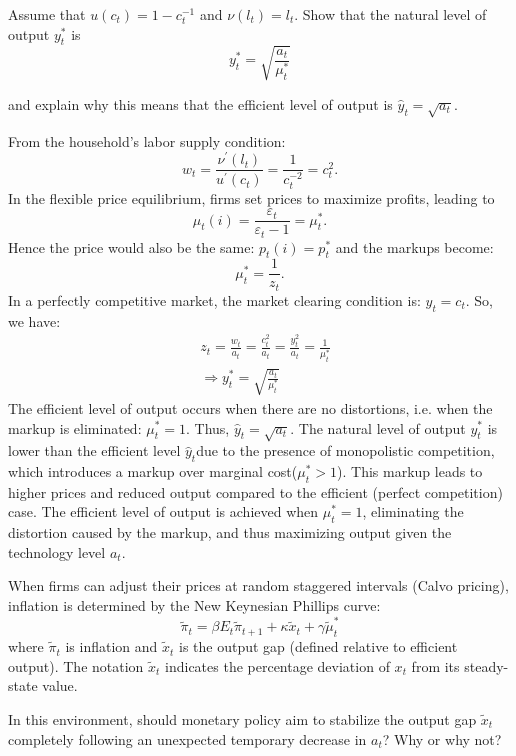 \begin{problem*}[b]
    Assume that $u(c_t) = 1 - c_t^{-1}$ and $\nu(l_t) = l_t$. Show that the natural level of output $y_t^*$ is
    \[
    y_t^* = \sqrt{\frac{a_t}{\mu_t^*}}
    \]

    and explain why this means that the efficient level of output is $\hat{y}_t = \sqrt{a_t}$.
\end{problem*}

\begin{solution}
    From the household's labor supply condition:
    \[w_t = \frac{\nu ^{\prime} (l_t)}{u^{\prime} (c_t)} = \frac{1}{c_t^{-2}} = c_t^2.\]
    In the flexible price equilibrium, firms set prices to maximize profits, leading to
    \[\mu_t(i) = \frac{\varepsilon_t}{\varepsilon_t - 1} = \mu_t^*.\]
    Hence the price would also be the same: $p_t(i) = p_t^*$ and the markups become:
    \[\mu_t^* = \frac{1}{z_t}.\]
    In a perfectly competitive market, the market clearing condition is: $y_t = c_t$. So, we have:
    \begin{align*}
        & z_t = \frac{w_t}{a_t} = \frac{c_t^2}{a_t} = \frac{y_t^2}{a_t} = \frac{1}{\mu_t^*} \\
        & \Rightarrow y_t^* = \sqrt{\frac{a_t}{\mu_t^*}}
    \end{align*}
    The efficient level of output occurs when there are no distortions, i.e. when the markup is eliminated: $\mu_t^* = 1$.
    Thus, $\hat{y}_t = \sqrt{a_t}.$
    The natural level of output $y_t^*$ is lower than the efficient level $\hat{y}_t$due to the presence of monopolistic competition,
    which introduces a markup over marginal cost($\mu_t^* > 1$). This markup leads to higher prices and reduced output compared to the efficient (perfect competition) case. 
    The efficient level of output is achieved when $\mu_t^* = 1$, eliminating the distortion caused by the markup, and thus maximizing output given the technology level $a_t$.
\end{solution}

When firms can adjust their prices at random staggered intervals (Calvo pricing), inflation is determined by the New Keynesian Phillips curve:
\[
\tilde{\pi}_t = \beta E_t \tilde{\pi}_{t+1} + \kappa \tilde{x}_t + \gamma \tilde{\mu}_t^*
\]
where $\tilde{\pi}_t$ is inflation and $\tilde{x}_t$ is the output gap (defined relative to efficient output). The notation $\tilde{x}_t$ indicates the percentage deviation of $x_t$ from its steady-state value.

\begin{problem*}[c]
    In this environment, should monetary policy aim to stabilize the output gap $\tilde{x}_t$ completely following an unexpected temporary decrease in $a_t$? Why or why not?
\end{problem*}

